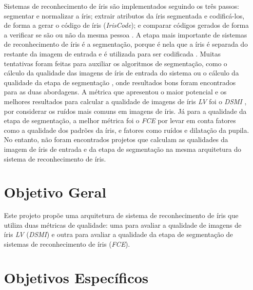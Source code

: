 \par Sistemas de reconhecimento de íris são implementados seguindo os três passos: segmentar e normalizar a íris; extrair atributos da íris segmentada e codificá-los, de forma a gerar o código de íris (\textit{IrisCode}); e comparar códigos gerados de forma a verificar se são ou não da mesma pessoa \cite{wayman2005biometric}. A etapa mais importante de sistemas de reconhecimento de íris é a segmentação, porque é nela que a íris é separada do restante da imagem de entrada e é utilizada para ser codificada \cite{daugman2004}. Muitas tentativas foram feitas para auxiliar os algoritmos de segmentação, como o cálculo da qualidade das imagens de íris de entrada do sistema \cite{daugman2004, starovoitov2013-DSMI-45, Jenadeleh_2018_CVPR_Workshops, wan2007-DSMI-50, bergmller2017-DSMI-2, chen2013-DSMI-4, kalka2010-DSMI-18, li2011} ou o cálculo da qualidade da etapa de segmentação \cite{proenca2011, du2010, belcher2008, mottalli2009-DSMI-30, ma2003-FIM-7}, onde resultados bons foram encontrados para as duas abordagens. A métrica que apresentou o maior potencial e os melhores resultados para calcular a qualidade de imagens de íris \textit{\acrshort{LV}} foi o \textit{\acrfull{DSMI}} \cite{Jenadeleh_2018_CVPR_Workshops}, por considerar os ruídos mais comuns em imagens de íris. Já para a qualidade da etapa de segmentação, a melhor métrica foi o \textit{\acrfull{FCE}} \cite{du2010} por levar em conta fatores como a qualidade dos padrões da íris, e fatores como ruídos e dilatação da pupila. No entanto, não foram encontrados projetos que calculam as qualidades da imagem de íris de entrada e da etapa de segmentação na mesma arquitetura do sistema de reconhecimento de íris.

\section{Objetivo Geral}

\par Este projeto propõe uma arquitetura de sistema de reconhecimento de íris que utiliza duas métricas de qualidade: uma para avaliar a qualidade de imagens de íris \textit{\acrshort{LV}} (\textit{\acrshort{DSMI}}) e outra para avaliar a qualidade da etapa de segmentação de sistemas de reconhecimento de íris (\textit{\acrshort{FCE}}).

\section{Objetivos Específicos}


